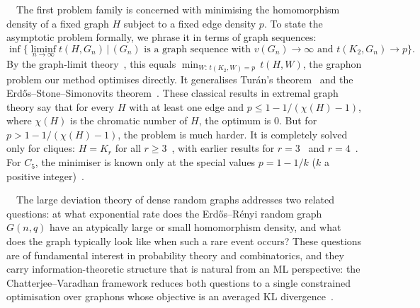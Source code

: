 \documentclass[11pt]{article}
\theoremstyle{plain}
\theoremstyle{definition}
\theoremstyle{remark}
\begin{document}
\ $\,$
The first problem family is concerned with minimising the homomorphism density of a fixed graph $H$ subject to a fixed edge density $p$. To state the asymptotic problem formally, we phrase it in terms of graph sequences:
\begin{equation}
\label{eqn:extremalproblem:generalisedTuran}
\inf\Big\{\liminf_{n \to \infty} t(H, G_n) \,\Big|\, \text{$(G_n)$ is a graph sequence with } v(G_n)\to\infty \text{ and } t(K_2, G_n)\to p\Big\}.
\end{equation}
By the graph-limit theory~\citep{lovasz2012large}, this equals $\min_{W:\,t(K_2,W)=p}\, t(H, W)$, the graphon problem our method optimises directly.
It generalises Tur\'an's theorem~\citep{turan1941eine}
and the Erd\H{o}s--Stone--Simonovits theorem~\citep{erdos1946structure, erdos1966limit}. These classical results in extremal graph theory say
that for every $H$ with at least one edge and $p \leq 1 - 1/(\chi(H) - 1)$, where $\chi(H)$ is the chromatic number of $H$, the optimum is $0$. But for $p > 1 - 1/(\chi(H) - 1)$, the problem is much harder. It is completely solved only for cliques: $H = K_r$ for all $r \ge 3$~\citep{reiher2016clique}, with earlier results for $r = 3$~\citep{razborov2008minimal} and $r = 4$~\citep{nikiforov2011number}. For $C_5$, the minimiser is known only at the special values $p = 1 - 1/k$ ($k$ a positive integer)~\citep{bennett2020minimizing}.

\ $\,$
The large deviation theory of dense random graphs addresses two related questions: at what exponential rate does the Erd\H{o}s--R\'enyi random graph $G(n,q)$ have an atypically large or small homomorphism density, and what does the graph typically look like when such a rare event occurs?
These questions are of fundamental interest in probability theory and combinatorics, and they carry information-theoretic structure that is natural from an ML perspective: the Chatterjee--Varadhan framework reduces both questions to a single constrained optimisation over graphons whose objective is an averaged KL divergence~\citep{chatterjee2011large}.
\end{document}
